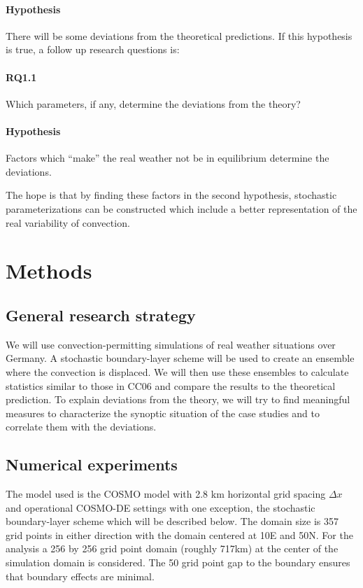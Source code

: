 \documentclass[a4paper, 12pt]{article}
\begin{document}
\paragraph{Hypothesis} There will be some deviations from the theoretical predictions. 
If this hypothesis is true, a follow up research questions is:
\paragraph{RQ1.1} Which parameters, if any, determine the deviations from the theory?
\paragraph{Hypothesis} Factors which ``make'' the real weather not be in equilibrium determine the deviations.

The hope is that by finding these factors in the second hypothesis, stochastic parameterizations can be constructed which include a better representation of the real variability of convection. 

\section{Methods}

\subsection{General research strategy}
We will use convection-permitting simulations of real weather situations over Germany. A stochastic boundary-layer scheme will be used to create an ensemble where the convection is displaced. We will then use these ensembles to calculate statistics similar to those in CC06 and compare the results to the theoretical prediction. To explain deviations from the theory, we will try to find meaningful measures to characterize the synoptic situation of the case studies and to correlate them with the deviations.  

\subsection{Numerical experiments}
The model used is the COSMO model with 2.8 km horizontal grid spacing $\Delta x$ and operational COSMO-DE settings with one exception, the stochastic boundary-layer scheme which will be described below. The domain size is 357 grid points in either direction with the domain centered at 10E and 50N. For the analysis a 256 by 256 grid point domain (roughly 717km) at the center of the simulation domain is considered. The 50 grid point gap to the boundary ensures that boundary effects are minimal. 
\end{document}
